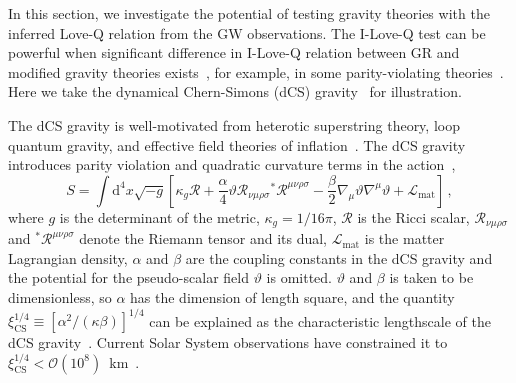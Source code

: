 \documentclass[a4paper,11pt]{article}
\begin{document}
In this section, we investigate the potential of testing gravity theories with
the inferred Love-Q relation from the GW observations. The I-Love-Q test can be 
powerful when significant difference in I-Love-Q relation between GR and
modified gravity theories exists~\cite{Shao:2022koz}, for example, in some
parity-violating theories~\cite{Yagi_2017, Yunes:2025xwp}.  Here we take the
dynamical Chern-Simons (dCS) gravity~\cite{Jackiw:2003pm, Smith:2007jm,
Alexander:2009tp} for illustration. 

The dCS gravity is well-motivated from heterotic superstring theory, loop
quantum gravity, and effective field theories of inflation~\cite{Jackiw:2003pm,
Smith:2007jm, Alexander:2009tp}.  The dCS gravity introduces parity violation
and quadratic curvature terms in the action~\cite{Alexander:2009tp,
Gupta:2017vsl},
\begin{equation}
   \label{cs_action}
   S = \int \mathrm{d}^4 x \sqrt{-g}\left[ \kappa_g \mathcal{R} +
   \frac{\alpha}{4} \mathcal{\vartheta} \mathcal{R}_{\nu\mu\rho\sigma}
   {}^{*}\mathcal{R}^{\mu\nu\rho\sigma} -
   \frac{\beta}{2}\nabla_{\mu}\mathcal{\vartheta}\nabla^{\mu}\mathcal{\vartheta}
   + \mathcal{L}_{\mathrm{mat}}\right]\,,
\end{equation}
where $g$ is the determinant of the metric, $\kappa_g= 1/16\pi$, $\mathcal{R}$
is the Ricci scalar, $\mathcal{R}_{\nu\mu\rho\sigma}$ and
$^{*}\mathcal{R}^{\mu\nu\rho\sigma}$ denote the Riemann tensor and its dual, 
$\mathcal{L}_{\mathrm{mat}}$ is the matter Lagrangian density, $\alpha$ and
$\beta$ are the coupling constants in the dCS gravity and the potential for the
pseudo-scalar field $\mathcal{\vartheta}$ is omitted.  $\mathcal{\vartheta}$ and
$\beta$ is taken to be dimensionless, so $\alpha$ has the dimension of length
square, and the quantity $\xi_{\mathrm{CS}}^{1/4} \equiv [\alpha^2/
(\kappa\beta)]^{1/4}$ can be explained as the characteristic lengthscale of the
dCS gravity~\cite{Yunes:2009hc, Yagi:2012ya}.  Current Solar System observations
have constrained it to $\xi_{\mathrm{CS}}^{1/4} <\mathcal{O}(10^8
)$~km~\cite{Ali-Haimoud:2011zme, Yagi:2012ya}.
\end{document}
